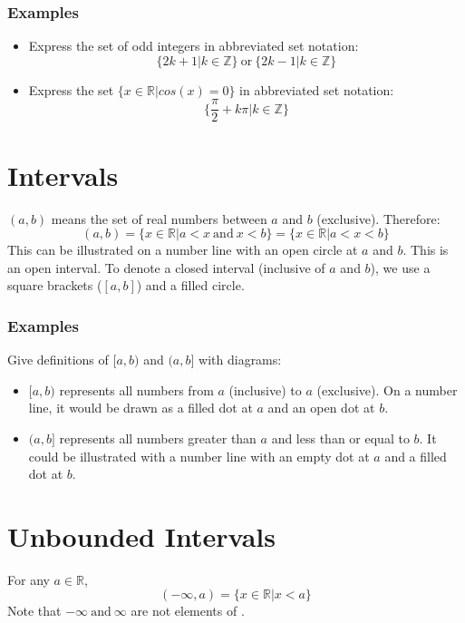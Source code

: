 \documentclass[12pt]{report}
\begin{document}
\begin{flushleft}
\subsubsection*{Examples}

\begin{itemize}
\item Express the set of odd integers in abbreviated set notation: 
\[\{2k + 1 | k \in \mathbb{Z}\} \:\mathrm{or}\: \{2k - 1 | k \in \mathbb{Z}\}\]
\item Express the set \(\{x \in \mathbb{R} | cos(x) = 0\}\) in abbreviated set notation: 
\[\{\frac{\pi}{2} + k\pi | k \in \mathbb{Z}\}\]
\end{itemize}


\section*{Intervals}
\((a, b)\) means the set of real numbers between \(a\) and \(b\) (exclusive). Therefore:
\[(a, b) = \{ x \in \mathbb{R} | a < x \:\mathrm{and}\: x < b\} = \{ x \in \mathbb{R} | a < x < b\} \]
This can be illustrated on a number line with an open circle at \(a\) and \(b\). This is an open interval.
To denote a closed interval (inclusive of \(a\) and \(b\)), we use a square brackets (\([a, b]\)) and a filled circle.

\subsubsection*{Examples}
Give definitions of \([a, b)\) and \((a, b]\) with diagrams:
\begin{itemize}
\item \([a, b)\) represents all numbers from \(a\) (inclusive) to \(a\) (exclusive). On a number line, it would be drawn as a filled dot at \(a\) and an open dot at \(b\).
\item \((a, b]\) represents all numbers greater than \(a\) and less than or equal to \(b\). It could be illustrated with a number line with an empty dot at \(a\) and a filled dot at \(b\).
\end{itemize}


\section*{Unbounded Intervals}
For any \(a \in \mathbb{R}\), 
\[(-\infty, a) = \{x \in \mathbb{R} | x < a\}\]
Note that \(-\infty \:\mathrm{and}\: \infty\) are not elements of .


\end{flushleft}
\end{document}
